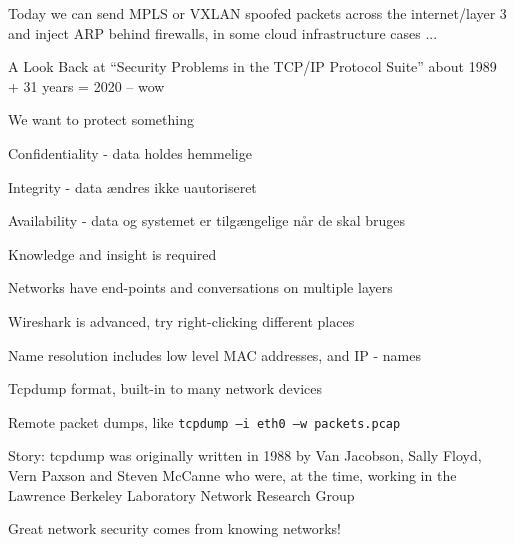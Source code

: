 \documentclass[Screen16to9,17pt]{foils}
\begin{document}
Today we can send MPLS or VXLAN spoofed packets across the internet/layer 3 and inject ARP behind firewalls, in some cloud infrastructure cases ...\\
{\footnotesize{}}

A Look Back at “Security Problems in the TCP/IP Protocol Suite”
about 1989 + 31 years = 2020 -- wow





\begin{list1}
\item We want to protect something
\item Confidentiality - data holdes hemmelige
\item Integrity - data ændres ikke uautoriseret
\item Availability - data og systemet er tilgængelige når de skal bruges
\end{list1}





Knowledge and insight is required
\begin{list2}
\item Networks have end-points and conversations on multiple layers
\item Wireshark is advanced, try right-clicking different places
\item Name resolution includes low level MAC addresses, and IP - names
\end{list2}

\begin{list2}
\item Tcpdump format, built-in to many network devices
\item Remote packet dumps, like \verb+tcpdump –i eth0 –w packets.pcap+
\item Story: tcpdump was originally written in 1988 by Van Jacobson, Sally Floyd, Vern Paxson and Steven McCanne who were, at the time, working in the Lawrence Berkeley Laboratory Network Research Group\\
\end{list2}

\vskip 5mm

\centerline{\Large Great network security comes from knowing networks!}
\end{document}
